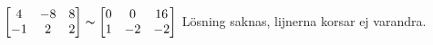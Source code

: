 $\begin{bmatrix}
4 &-8 &8 \\
-1 &2 &2 
\end{bmatrix}\thicksim
\begin{bmatrix}
0 &0 &16 \\
 1&-2 &-2 
\end{bmatrix}
$ Lösning saknas, lijnerna korsar ej varandra.
